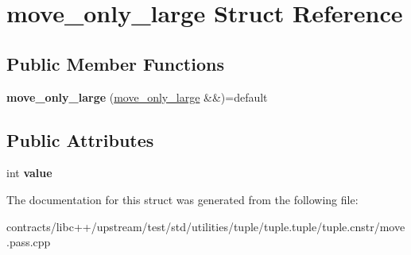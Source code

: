 \hypertarget{structmove__only__large}{}\section{move\+\_\+only\+\_\+large Struct Reference}
\label{structmove__only__large}
\subsection*{Public Member Functions}
\begin{DoxyCompactItemize}
\item 
\mbox{\label{structmove__only__large_aecbafa4a2cf651b767a5e4f50b1ed99a}} 
{\bfseries move\+\_\+only\+\_\+large} (\mbox{\hyperlink{structmove__only__large}{move\+\_\+only\+\_\+large}} \&\&)=default
\end{DoxyCompactItemize}
\subsection*{Public Attributes}
\begin{DoxyCompactItemize}
\item 
\mbox{\label{structmove__only__large_aec5c3ae49ed0b272222a6a8cff7542a2}} 
int {\bfseries value}
\end{DoxyCompactItemize}


The documentation for this struct was generated from the following file\+:\begin{DoxyCompactItemize}
\item 
contracts/libc++/upstream/test/std/utilities/tuple/tuple.\+tuple/tuple.\+cnstr/move.\+pass.\+cpp\end{DoxyCompactItemize}
